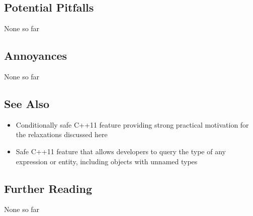 \subsection[Potential Pitfalls]{Potential Pitfalls}\label{potential-pitfalls}

None so far

\subsection[Annoyances]{Annoyances}\label{annoyances}

None so far

\subsection[See Also]{See Also}\label{see-also}

\begin{itemize}
\item{Conditionally safe C++11 feature providing strong practical motivation for the relaxations discussed here}
\item{Safe C++11 feature that allows developers to query the type of any expression or entity, including objects with unnamed types}
\end{itemize}

\subsection[Further Reading]{Further Reading}\label{further-reading}

None so far



